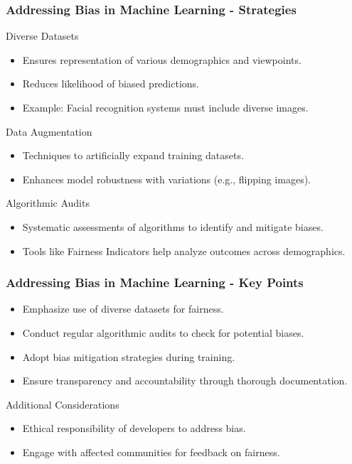\documentclass[aspectratio=169]{beamer}
\begin{document}
\begin{frame}[fragile]
    \frametitle{Addressing Bias in Machine Learning - Strategies}
    \begin{block}{Diverse Datasets}
        \begin{itemize}
            \item Ensures representation of various demographics and viewpoints.
            \item Reduces likelihood of biased predictions.
            \item Example: Facial recognition systems must include diverse images.
        \end{itemize}
    \end{block}

    \begin{block}{Data Augmentation}
        \begin{itemize}
            \item Techniques to artificially expand training datasets.
            \item Enhances model robustness with variations (e.g., flipping images).
        \end{itemize}
    \end{block}
    
    \begin{block}{Algorithmic Audits}
        \begin{itemize}
            \item Systematic assessments of algorithms to identify and mitigate biases.
            \item Tools like Fairness Indicators help analyze outcomes across demographics.
        \end{itemize}
    \end{block}
\end{frame}

\begin{frame}[fragile]
    \frametitle{Addressing Bias in Machine Learning - Key Points}
    \begin{itemize}
        \item Emphasize use of diverse datasets for fairness.
        \item Conduct regular algorithmic audits to check for potential biases.
        \item Adopt bias mitigation strategies during training.
        \item Ensure transparency and accountability through thorough documentation.
    \end{itemize}

    \begin{block}{Additional Considerations}
        \begin{itemize}
            \item Ethical responsibility of developers to address bias.
            \item Engage with affected communities for feedback on fairness.
        \end{itemize}
    \end{block}
\end{frame}
\end{document}
